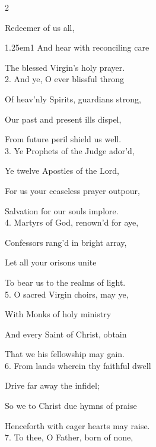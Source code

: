 \begin{paracol}{2}
\sloppy

\vspace{-1\baselineskip}

\firstEvensong
{}

\firstEvensongHymn
{} Redeemer of us all,


\begin{hangparas}{1.25em}{1}
And hear with reconciling care

The blessed Virgin's holy prayer.\\

2. And ye, O ever blissful throng

Of heav'nly Spirits, guardians strong,

Our past and present ills dispel,

From future peril shield us well.\\

3. Ye Prophets of the Judge ador'd,

Ye twelve Apostles of the Lord,

For us your ceaseless prayer outpour,

Salvation for our souls implore.\\

4. Martyrs of God, renown'd for aye,

Confessors rang'd in bright array,

Let all your orisons unite

To bear us to the realms of light.\\

5. O sacred Virgin choirs, may ye,

With Monks of holy ministry

And every Saint of Christ, obtain

That we his fellowship may gain.\\

6. From lands wherein thy faithful dwell

Drive far away the infidel;

So we to Christ due hymns of praise

Henceforth with eager hearts may raise.\\

7. To thee, O Father, born of none,


\end{hangparas}
\end{paracol}
